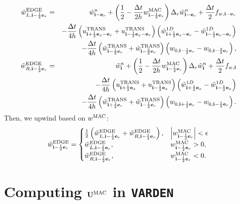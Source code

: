 \documentclass[11pt]{article}
\def\half  {\frac{1}{2}}
\def\dt    {\Delta t}
\def\edge  {\rm EDGE}
\def\mac   {\rm MAC}
\def\trans {\rm TRANS}
\def\eb    {{\bf e}}
\def\ib    {{\bf i}}
\def\Ub    {{\bf U}}
\def\wt    {\tilde{w}}
\begin{document}
\begin{eqnarray}
\wt_{L,\ib-\half\eb_r}^{\edge} &=& \wt_{\ib-\eb_r}^n + \left(\half - \frac{\dt}{2h}w_{\ib-\half\eb_r}^{\mac}\right)\Delta_r \wt_{\ib-\eb_r}^n + \frac{\dt}{2}f_{w,\ib-\eb_r} \nonumber \\
&& - \frac{\dt}{4h}\left(u_{\ib+\half\eb_x-\eb_r}^{\trans}+u_{\ib-\half\eb_x-\eb_r}^{\trans}\right)\left(\wt_{\ib+\half\eb_x-\eb_r}^{1D} - \wt_{\ib-\half\eb_x-\eb_r}^{1D}\right) \nonumber \\
&& -
\frac{\dt}{4h}\left(\wt_{\ib-\half\eb_r}^{\trans}+\wt_{\ib-\frac{3}{2}\eb_r}^{\trans}\right)\left(w_{0,\ib-\half\eb_r}-w_{0,\ib-\frac{3}{2}\eb_r}\right), \label{wt_L r-edge} \\
\wt_{R,\ib-\half\eb_r}^{\edge} &=& \wt_{\ib}^n + \left(\half - \frac{\dt}{2h}w_{\ib-\half\eb_r}^{\mac}\right)\Delta_r \wt_{\ib}^n + \frac{\dt}{2}f_{w,\ib} \nonumber \\
&& - \frac{\dt}{4h}\left(u_{\ib+\half\eb_x}^{\trans}+u_{\ib-\half\eb_x}^{\trans}\right)\left(\wt_{\ib+\half\eb_x}^{1D} - \wt_{\ib-\half\eb_x}^{1D}\right) \nonumber \\
&& -
\frac{\dt}{4h}\left(\wt_{\ib+\half\eb_r}^{\trans}+\wt_{\ib-\half\eb_r}^{\trans}\right)\left(w_{0,\ib+\half\eb_r}-w_{0,\ib-\half\eb_r}\right). \label{wt_R r-edge}
\end{eqnarray}
Then, we upwind based on $w^{\mac}$:
\begin{equation}
\wt_{\ib-\half\eb_r}^{\edge} =
\begin{cases}
\half\left(\wt_{L,\ib-\half\eb_r}^{\edge} + \wt_{R,\ib-\half\eb_r}^{\edge}\right), & \left|w^{\mac}_{\ib-\half\eb_r}\right| < \epsilon \\
\wt_{L,\ib-\half\eb_r}^{\edge}, & w^{\mac}_{\ib-\half\eb_r} > 0, \\
\wt_{R,\ib-\half\eb_r}^{\edge}, & w^{\mac}_{\ib-\half\eb_r} < 0.
\end{cases}
\end{equation}
\cleardoublepage
\section{Computing $\Ub^{\mac}$ in {\tt VARDEN}}
\end{document}
